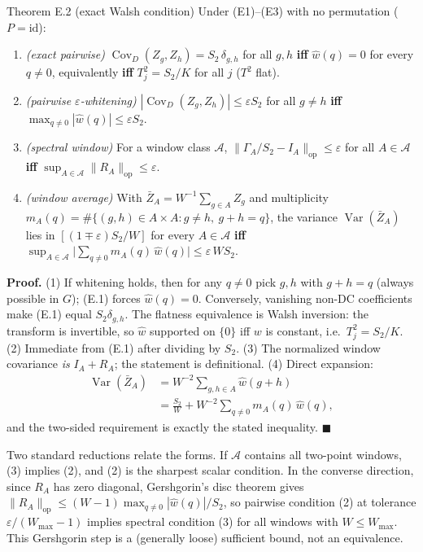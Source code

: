 \begin{namedthm}{Theorem E.2 (exact Walsh condition)}
Under (E1)--(E3) with no permutation ($P=\mathrm{id}$):
\begin{enumerate}
\item \emph{(exact pairwise)} $\operatorname{Cov}_D(Z_g,Z_h)=S_2\,\delta_{g,h}$ for all $g,h$ \textbf{iff} $\hat w(q)=0$ for every $q\neq0$, equivalently \textbf{iff} $T_j^2=S_2/K$ for all $j$ ($T^2$ flat).
\item \emph{(pairwise $\varepsilon$-whitening)} $|\operatorname{Cov}_D(Z_g,Z_h)|\le\varepsilon S_2$ for all $g\neq h$ \textbf{iff} $\max_{q\neq0}|\hat w(q)|\le\varepsilon S_2$.
\item \emph{(spectral window)} For a window class $\mathcal{A}$, $\|\Gamma_A/S_2-I_A\|_{\mathrm{op}}\le\varepsilon$ for all $A\in\mathcal{A}$ \textbf{iff} $\sup_{A\in\mathcal{A}}\|R_A\|_{\mathrm{op}}\le\varepsilon$.
\item \emph{(window average)} With $\bar Z_A=W^{-1}\sum_{g\in A}Z_g$ and multiplicity $m_A(q)=\#\{(g,h)\in A\times A: g\neq h,\ g+h=q\}$, the variance $\operatorname{Var}(\bar Z_A)$ lies in $[(1\mp\varepsilon)S_2/W]$ for every $A\in\mathcal{A}$ \textbf{iff} $\sup_{A\in\mathcal{A}}\big|\sum_{q\neq0}m_A(q)\,\hat w(q)\big|\le\varepsilon\,W S_2$.
\end{enumerate}
\end{namedthm}

\noindent\textbf{Proof.} (1) If whitening holds, then for any $q\neq0$ pick $g,h$ with $g+h=q$ (always possible in $G$); (E.1) forces $\hat w(q)=0$. Conversely, vanishing non-DC coefficients make (E.1) equal $S_2\delta_{g,h}$. The flatness equivalence is Walsh inversion: the transform is invertible, so $\hat w$ supported on $\{0\}$ iff $w$ is constant, i.e.\ $T_j^2=S_2/K$. (2) Immediate from (E.1) after dividing by $S_2$. (3) The normalized window covariance \emph{is} $I_A+R_A$; the statement is definitional. (4) Direct expansion:
\[
\begin{split}
\operatorname{Var}(\bar Z_A)&=W^{-2}\!\!\sum_{g,h\in A}\hat w(g+h)\\
&=\frac{S_2}{W}+W^{-2}\sum_{q\neq0}m_A(q)\,\hat w(q),
\end{split}
\]
and the two-sided requirement is exactly the stated inequality. \hfill$\blacksquare$

Two standard reductions relate the forms. If $\mathcal{A}$ contains all two-point windows, (3) implies (2), and (2) is the sharpest scalar condition. In the converse direction, since $R_A$ has zero diagonal, Gershgorin's disc theorem gives $\|R_A\|_{\mathrm{op}}\le(W-1)\max_{q\neq0}|\hat w(q)|/S_2$, so pairwise condition (2) at tolerance $\varepsilon/(W_{\max}-1)$ implies spectral condition (3) for all windows with $W\le W_{\max}$. This Gershgorin step is a (generally loose) sufficient bound, not an equivalence.

